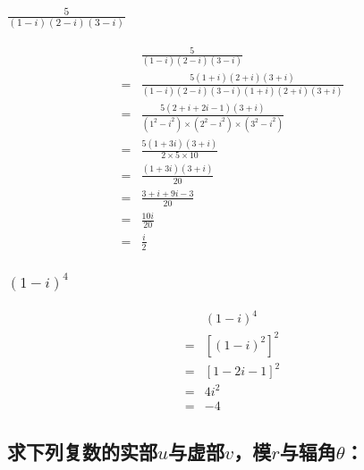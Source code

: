 \documentclass[10pt,a4paper,twocolumn]{ctexart}
\numberwithin{equation}{subsection}
\begin{document}
\subsubsection{$\frac{5}{(1-i)(2-i)(3-i)}$}
\begin{align}
		& \frac{5}{(1-i)(2-i)(3-i)} \\
		= & \frac{5(1+i)(2+i)(3+i)}{(1-i)(2-i)(3-i)(1+i)(2+i)(3+i)} \\
		= & \frac{5(2+i+2 i-1)(3+i)}{(1^2-i^2) \times (2^2-i^2) \times (3^2-i^2)} \\
		= & \frac{5(1+3 i)(3+i)}{2 \times 5 \times 10} \\
		= & \frac{(1+3 i)(3+i)}{20} \\
		= & \frac{3+i+9 i-3}{20} \\
		= & \frac{10 i}{20} \\
		= & \frac{i}{2}
	\end{align}

\subsubsection{$(1-i)^4$}
\begin{align}
		& (1-i)^4 \\
		= & {\left[(1-i)^2\right]^2 } \\
		= & {[1-2 i-1]^2 } \\
		= & 4 i^2 \\
		= & -4
	\end{align}


\subsection{求下列复数的实部$u$与虚部$v$，模$r$与辐角$\theta$：}

\end{document}
